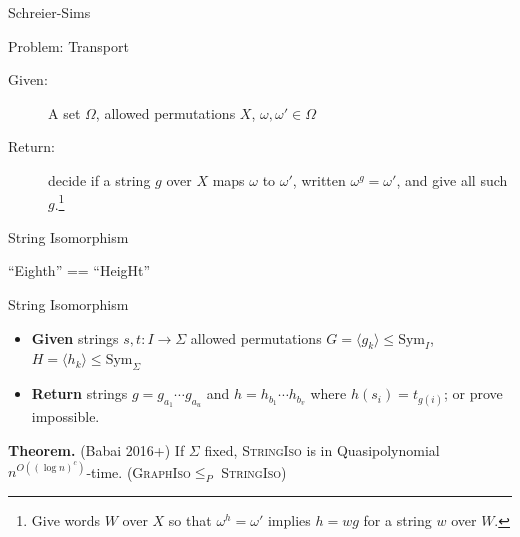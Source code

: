 \documentclass{beamer}
\begin{document}
\begin{frame}{Schreier-Sims}

    \begin{block}{Problem: Transport}
    \begin{description}
        \item[Given:] A set $\Omega$, allowed permutations $X$, $\omega,\omega'\in\Omega$
        \item[Return:] decide if a string $g$ over $X$ maps $\omega$ to $\omega'$, 
        written $\omega^{g}=\omega'$, and give all such $g$.\footnote{Give words $W$ over $X$
        so that $\omega^h=\omega'$ implies $h=wg$ for a string $w$ over $W$.}
    \end{description}
    \end{block}
\end{frame}



\begin{frame}[fragile]{String Isomorphism}
\begin{center}
    ``Eighth'' == ``HeigHt''
\end{center}
\pause
\begin{block}{String Isomorphism}
\noindent
\begin{minipage}{0.6\textwidth}
\noindent
\begin{itemize}
\item {\color{csugreen}\textbf{Given}} strings $s,t:I\to \Sigma$
allowed permutations $G=\langle g_k\rangle\leq \mathrm{Sym}_{I}$, 
$H=\langle h_k\rangle\leq \mathrm{Sym}_{\Sigma}$
\item {\color{csugreen}\textbf{Return}} strings $g=g_{a_1}\cdots g_{a_u}$ 
and $h=h_{b_1}\cdots h_{b_v}$ where $h(s_{i})=t_{g(i)}$; or prove impossible.
\end{itemize}
\end{minipage}
\begin{minipage}{0.3\textwidth}
\end{minipage}
\end{block}
\pause

\textbf{Theorem.} (Babai 2016+) If $\Sigma$ fixed, \textsc{StringIso} 
is in Quasipolynomial $n^{O((\log n)^c)}$-time.
\vfill
(\textsc{GraphIso}$\leq_P$ \textsc{StringIso})

\end{frame}
\end{document}
